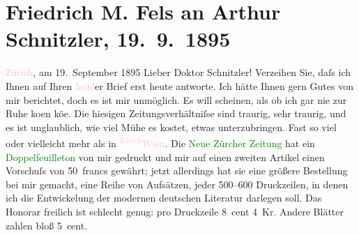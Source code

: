 

               \section[Friedrich M. Fels an Arthur Schnitzler, 19. 9. 1895]{ Friedrich M. Fels an Arthur Schnitzler, 19. 9. 1895}\nopagebreak{}\rehead{ }\normalsize\beginnumbering{} \toendnotes[C]{\smallbreak\pagebreak[2]} 
\toendnotes[C]{\smallbreak}\pstart
           \raggedleft{}{\pb}\textcolor{pink}{Zürich}{}\ledrightnote{\textcolor{pink}{Zürich}}, am 19. September 1895\pend
           \pstart\center{}Lieber Doktor Schnitzler!\pend\pstart
           Verzeihen Sie, daſs ich Ihnen auf Ihren \textcolor{pink}{Ischl}{}\ledrightnote{\textcolor{pink}{Bad Ischl}}er
                    Brief erst heute antworte. Ich hätte Ihnen gern Gutes von mir berichtet, doch es
                    ist mir unmöglich. Es will scheinen, als ob ich gar nie zur Ruhe ko{\geminationm}en kö{\geminationn}e. Die
                    hiesigen Zeitungsverhältniſse sind traurig, sehr traurig, und es ist
                    unglaublich, wie viel Mühe es kostet, etwas unterzubringen. Fast so viel oder
                    vielleicht mehr als in \substVorne{}\textsuperscript{\textcolor{pink}{Zürich}{}\ledrightnote{\textcolor{pink}{Zürich}}}{\allowbreak}\substDazwischen{}\textcolor{pink}{Wien}{}\ledrightnote{\textcolor{pink}{Wien}}\substHinten{}. Die \textcolor{green}{Neue Zürcher Zeitung}{}\ledrightnote{\textcolor{green}{Neue Zürcher Zeitung}} hat ein \textcolor{green}{Doppelfeuilleton}{} von mir
                    gedruckt und mir auf einen zweiten Artikel einen Vorschuſs von 50 francs
                    gewährt; jetzt allerdings hat sie eine größere Bestellung bei mir gemacht, eine
                    Reihe von Aufsätzen, jeder 500–600 Druckzeilen, in denen ich die Entwickelung
                    der modernen deutschen Literatur darlegen soll. Das Honorar freilich ist
                    schlecht genug: pro Druckzeile 8 cent 4 Kr. Andere Blätter zahlen bloß 5 cent.
